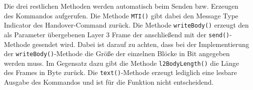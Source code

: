 Die drei restlichen Methoden werden automatisch beim Senden bzw. Erzeugen des Kommandos aufgerufen. Die Methode \lstinline{MTI()} gibt dabei den Message Type Indicator des Handover-Command zurück. Die Methode \lstinline{writeBody()} erzeugt den als Parameter übergebenen Layer 3 Frame der anschließend mit der \lstinline{send()}-Methode gesendet wird. Dabei ist darauf zu achten, dass bei der Implementierung der \lstinline{writeBody()}-Methode die Größe der einzelnen Blöcke in Bit angegeben werden muss. Im Gegensatz dazu gibt die Methode \lstinline{l2BodyLength()} die Länge des Frames in Byte zurück. Die \lstinline{text()}-Methode erzeugt lediglich eine lesbare Ausgabe des Kommandos und ist für die Funktion nicht entscheidend.
